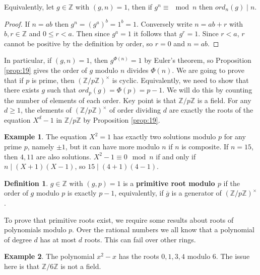 \documentclass{article}
\newcommand{\Z}{\mathbb{Z}}
\newcommand{\rb}[1]{\left( #1 \right)}
\newcommand{\unit}[1]{\rb{\Z / #1\Z}^\times}
\theoremstyle{definition}\newtheorem{definition}{Definition}
\theoremstyle{definition}\newtheorem{remark}[definition]{Remark}
\theoremstyle{definition}\newtheorem*{example}{Example}
\theoremstyle{definition}\newtheorem*{note}{Note}
\begin{document}
Equivalently, let $ g \in \Z $ with $ \rb{g, n} = 1 $, then if $ g^n \equiv \mod n $ then $ ord_n\rb{g} \mid n $.

\begin{proof}
If $ n = ab $ then $ g^n = \rb{g^a}^b = 1^b = 1 $. Conversely write $ n = ab + r $ with $ b, r \in \Z $ and $ 0 \le r < a $. Then since $ g^a = 1 $ it follows that $ g^r = 1 $. Since $ r < a $, $ r $ cannot be positive by the definition by order, so $ r = 0 $ and $ n = ab $.
\end{proof}

In particular, if $ \rb{g, n} = 1 $, then $ g^{\Phi\rb{n}} = 1 $ by Euler's theorem, so Proposition \ref{prop:19} gives the order of $ g $ modulo $ n $ divides $ \Phi\rb{n} $. We are going to prove that if $ p $ is prime, then $ \unit{p} $ is cyclic. Equivalently, we need to show that there exists $ g $ such that $ ord_p\rb{g} = \Phi\rb{p} = p - 1 $. We will do this by counting the number of elements of each order. Key point is that $ \Z / p\Z $ is a field. For any $ d \ge 1 $, the elements of $ \unit{p} $ of order dividing $ d $ are exactly the roots of the equation $ X^d - 1 $ in $ \Z / p\Z $ by Proposition \ref{prop:19}.

\begin{example}
The equation $ X^2 = 1 $ has exactly two solutions modulo $ p $ for any prime $ p $, namely $ \pm 1 $, but it can have more modulo $ n $ if $ n $ is composite. If $ n = 15 $, then $ 4, 11 $ are also solutions. $ X^2 - 1 \equiv 0 \mod n $ if and only if $ n \mid \rb{X + 1}\rb{X - 1} $, so $ 15 \mid \rb{4 + 1}\rb{4 - 1} $.
\end{example}

\begin{definition}
$ g \in \Z $ with $ \rb{g, p} = 1 $ is a \textbf{primitive root modulo $ p $} if the order of $ g $ modulo $ p $ is exactly $ p - 1 $, equivalently, if $ \overline{g} $ is a generator of $ \unit{p} $.
\end{definition}

To prove that primitive roots exist, we require some results about roots of polynomials modulo $ p $. Over the rational numbers we all know that a polynomial of degree $ d $ has at most $ d $ roots. This can fail over other rings.

\begin{example}
The polynomial $ x^2 - x $ has the roots $ 0, 1, 3, 4 $ modulo $ 6 $. The issue here is that $ \Z / 6\Z $ is not a field.
\end{example}
\end{document}
